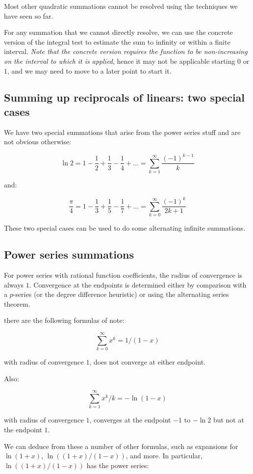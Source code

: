 \documentclass{amsart}
\begin{document}
Most other quadratic summations cannot be resolved using the
techniques we have seen so far.

For any summation that we cannot directly resolve, we can use the
concrete version of the integral test to estimate the sum to infinity
or within a finite interval. {\em Note that the concrete version
requires the function to be non-increasing on the interval to which it
is applied}, hence it may not be applicable starting $0$ or $1$, and
we may need to move to a later point to start it.

\subsection{Summing up reciprocals of linears: two special cases}

We have two special summations that arise from the power series stuff
and are not obvious otherwise:

$$\ln 2 = 1 - \frac{1}{2} + \frac{1}{3} - \frac{1}{4} + \dots = \sum_{k=1}^\infty \frac{(-1)^{k-1}}{k}$$

and:

$$\frac{\pi}{4} = 1 - \frac{1}{3} + \frac{1}{5} - \frac{1}{7} + \dots = \sum_{k=0}^\infty \frac{(-1)^k}{2k + 1}$$

These two special cases can be used to do some alternating infinite
summations.

\subsection{Power series summations}

For power series with rational function coefficients, the radius of
convergence is always $1$. Convergence at the endpoints is determined
either by comparison with a $p$-series (or the degree difference
heuristic) or using the alternating series theorem.

there are the following formulas of note:

$$\sum_{k=0}^\infty x^k = 1/(1 - x)$$

with radius of convergence $1$, does not converge at either endpoint.

Also:

$$\sum_{k=1}^\infty x^k/k = -\ln(1 - x)$$

with radius of convergence $1$, converges at the endpoint $-1$ to
$-\ln 2$ but not at the endpoint $1$.

We can deduce from these a number of other formulas, such as
expansions for $\ln(1 + x)$, $\ln((1 + x)/(1 - x))$, and more. In particular, $\ln((1 + x)/(1 - x))$ has the power series:
\end{document}
